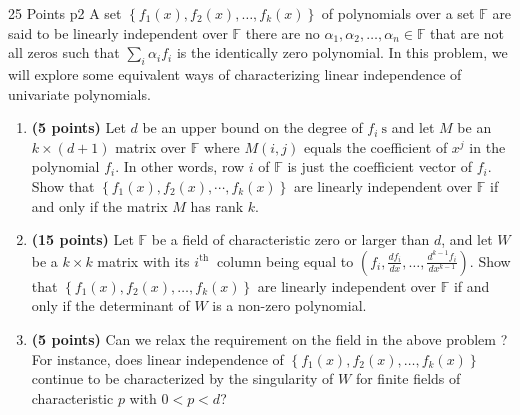 \documentclass[a4paper, 11pt]{article}
\begin{document}
\begin{problem}{%
	\hfill 25 Points
	}{p2%
	}
A set $\left\{f_1(x), f_2(x), \ldots, f_k(x)\right\}$ of polynomials over a set $\mathbb{F}$ are said to be linearly independent over $\mathbb{F}$ there are no $\alpha_1, \alpha_2, \ldots, \alpha_n \in \mathbb{F}$ that are not all zeros such that $\sum_i \alpha_i f_i$ is the identically zero polynomial. In this problem, we will explore some equivalent ways of characterizing linear independence of univariate polynomials.\begin{enumerate}[label=(\alph*)]
	\item \textbf{(5 points)} Let $d$ be an upper bound on the degree of $f_i \mathrm{~s}$ and let $M$ be an $k \times(d+1)$ matrix over $\mathbb{F}$ where $M(i, j)$ equals the coefficient of $x^j$ in the polynomial $f_i$. In other words, row $i$ of $\mathbb{F}$ is just the coefficient vector of $f_i$. Show that $\left\{f_1(x), f_2(x), \cdots, f_k(x)\right\}$ are linearly independent over $\mathbb{F}$ if and only if the matrix $M$ has rank $k$.
\item \textbf{(15 points)} Let $\mathbb{F}$ be a field of characteristic zero or larger than $d$, and let $W$ be a $k \times k$ matrix with its $i^{\text {th }}$ column being equal to $\left(f_i, \frac{d f_i}{d x}, \ldots, \frac{d^{k-1} f_i}{d x^{k-1}}\right)$. Show that $\left\{f_1(x), f_2(x), \ldots, f_k(x)\right\}$ are linearly independent over $\mathbb{F}$ if and only if the determinant of $W$ is a non-zero polynomial.
\item \textbf{(5 points)} Can we relax the requirement on the field in the above problem ? For instance, does linear independence of $\left\{f_1(x), f_2(x), \ldots, f_k(x)\right\}$ continue to be characterized by the singularity of $W$ for finite fields of characteristic $p$ with $0<p<d$?
\end{enumerate}
\end{problem}
\end{document}
